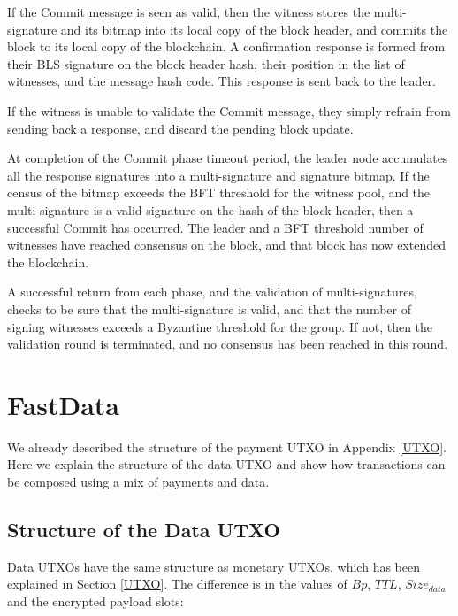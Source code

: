 \documentclass[8pt,fleqn,openany]{book}
\begin{document}
\begin{itemize}
{{  \item{If the Commit message is seen as valid, then the witness stores the multi-signature and its bitmap into its local copy of the block header, and commits the block to its local copy of the blockchain. A confirmation response is formed from their BLS signature on the block header hash, their position in the list of witnesses, and the message hash code. This response is sent back to the leader.}

  \item{If the witness is unable to validate the Commit message, they simply refrain from sending back a response, and discard the pending block update.}}

  \item{At completion of the Commit phase timeout period, the leader node accumulates all the response signatures into a multi-signature and signature bitmap. If the census of the bitmap exceeds the BFT threshold for the witness pool, and the multi-signature is a valid signature on the hash of the block header, then a successful Commit has occurred. The leader and a BFT threshold number of witnesses have reached consensus on the block, and that block has now extended the blockchain.}
  }
\end{itemize}

A successful return from each phase, and the validation of multi-signatures, checks to be sure that the multi-signature is valid, and that the number of signing witnesses exceeds a Byzantine threshold for the group. If not, then the validation round is terminated, and no consensus has been reached in this round.

\chapter{FastData}\label{app:fastdata}

We already described the structure of the payment UTXO in Appendix \ref{UTXO}. Here we explain the structure of the data UTXO and show how transactions can be composed using a mix of payments and data.

\section{Structure of the Data UTXO}

Data UTXOs have the same structure as monetary UTXOs, which has been explained in Section \ref{UTXO}. The difference is in the values of $Bp$, $TTL$, $Size_{data}$ and the encrypted payload slots:
\end{document}
